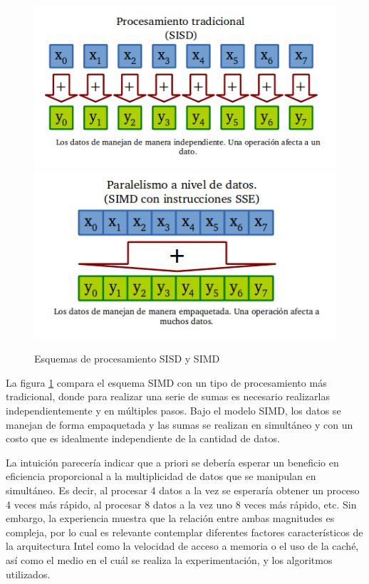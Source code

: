 \begin{figure}[h]
\begin{center}
  \includegraphics[scale=0.4]{secciones/introduccion/imagenes/SISD.png}
    \includegraphics[scale=0.4]{secciones/introduccion/imagenes/SIMD.png}
\end{center}
\caption{Esquemas de procesamiento SISD y SIMD}
\label{fig:SISD-SIMD}
\end{figure}

La figura \ref{fig:SISD-SIMD} compara el esquema SIMD con un tipo de procesamiento más tradicional, donde para realizar una serie de sumas es necesario realizarlas independientemente y en múltiples pasos. Bajo el modelo SIMD, los datos se manejan de forma empaquetada y las sumas se realizan en simultáneo y con un costo que es idealmente independiente de la cantidad de datos.

La intuición parecería indicar que a priori se debería esperar un beneficio en eficiencia proporcional a la multiplicidad de datos que se manipulan en simultáneo. Es decir, al procesar 4 datos a la vez se esperaría obtener un proceso 4 veces más rápido, al procesar 8 datos a la vez uno 8 veces más rápido, etc. Sin embargo, la experiencia muestra que la relación entre ambas magnitudes es compleja, por lo cual es relevante contemplar diferentes factores característicos de la arquitectura Intel como la velocidad de acceso a memoria o el uso de la caché, así como el medio en el cuál se realiza la experimentación, y los algoritmos utilizados.

